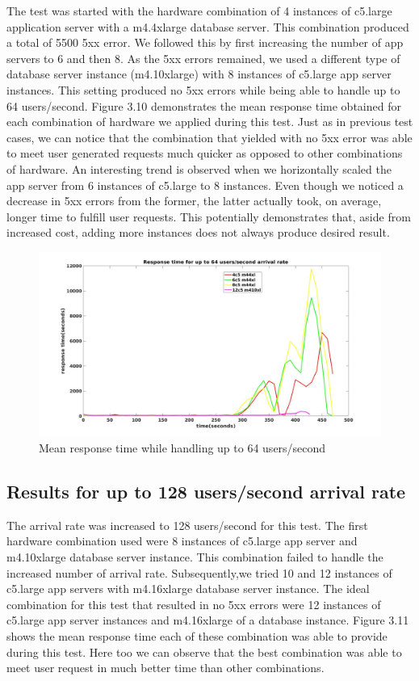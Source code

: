The test was started with the hardware combination of 4 instances of c5.large application server with a m4.4xlarge database server. This combination produced a total of 5500 5xx error. We followed this by first increasing the number of app servers to 6 and then 8. As the 5xx errors remained, we used a different type of database server instance (m4.10xlarge) with 8 instances of c5.large app server instances. This setting produced no 5xx errors while being able to handle up to 64 users/second. Figure 3.10 demonstrates the mean response time obtained for each combination of hardware we applied during this test. Just as in previous test cases, we can notice that the combination that yielded with no 5xx error was able to meet user generated requests much quicker as opposed to other combinations of hardware. An interesting trend is observed when we horizontally scaled the app server from 6 instances of c5.large to 8 instances. Even though we noticed a decrease in 5xx errors from the former, the latter actually took, on average, longer time to fulfill user requests. This potentially demonstrates that, aside from increased cost, adding more instances does not always produce desired result.

\begin{figure}[h]
	\centering
	\includegraphics[width=1\textwidth, height=0.5\textheight]{images/scale64.jpg}
	\caption{Mean response time while handling up to 64 users/second}\label{fig:sqlopt}
\end{figure}


\subsection{Results for up to 128 users/second arrival rate}
The arrival rate was increased to 128 users/second for this test. The first hardware combination used were 8 instances of c5.large app server and m4.10xlarge database server instance. This combination failed to handle the increased number of arrival rate. Subsequently,we tried 10 and 12 instances of c5.large app servers with m4.16xlarge database server instance. The ideal combination for this test that resulted in no 5xx errors were 12 instances of c5.large app server instances and m4.16xlarge of a database instance. Figure 3.11 shows the mean response time each of these combination was able to provide during this test. Here too we can observe that the best combination was able to meet user request in much better time than other combinations.

